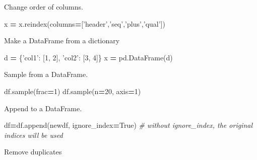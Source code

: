 \documentclass[]{book}
\newenvironment{Shaded}{\begin{snugshade}}{\end{snugshade}}
\newcommand{\CommentTok}[1]{\textcolor[rgb]{0.56,0.35,0.01}{\textit{#1}}}
\newcommand{\DecValTok}[1]{\textcolor[rgb]{0.00,0.00,0.81}{#1}}
\newcommand{\NormalTok}[1]{#1}
\newcommand{\OperatorTok}[1]{\textcolor[rgb]{0.81,0.36,0.00}{\textbf{#1}}}
\newcommand{\StringTok}[1]{\textcolor[rgb]{0.31,0.60,0.02}{#1}}
\newcommand{\VariableTok}[1]{\textcolor[rgb]{0.00,0.00,0.00}{#1}}
\begin{document}
Change order of columns.

\begin{Shaded}
\begin{Highlighting}[]
\NormalTok{x }\OperatorTok{=}\NormalTok{ x.reindex(columns}\OperatorTok{=}\NormalTok{[}\StringTok{'header'}\NormalTok{,}\StringTok{'seq'}\NormalTok{,}\StringTok{'plus'}\NormalTok{,}\StringTok{'qual'}\NormalTok{])}
\end{Highlighting}
\end{Shaded}

Make a DataFrame from a dictionary

\begin{Shaded}
\begin{Highlighting}[]
\NormalTok{d }\OperatorTok{=}\NormalTok{ \{}\StringTok{'col1'}\NormalTok{: [}\DecValTok{1}\NormalTok{, }\DecValTok{2}\NormalTok{], }\StringTok{'col2'}\NormalTok{: [}\DecValTok{3}\NormalTok{, }\DecValTok{4}\NormalTok{]\}}
\NormalTok{x }\OperatorTok{=}\NormalTok{ pd.DataFrame(d)}
\end{Highlighting}
\end{Shaded}

Sample from a DataFrame.

\begin{Shaded}
\begin{Highlighting}[]
\NormalTok{df.sample(frac}\OperatorTok{=}\DecValTok{1}\NormalTok{)}
\NormalTok{df.sample(n}\OperatorTok{=}\DecValTok{20}\NormalTok{, axis}\OperatorTok{=}\DecValTok{1}\NormalTok{)}
\end{Highlighting}
\end{Shaded}

Append to a DataFrame.

\begin{Shaded}
\begin{Highlighting}[]
\NormalTok{df}\OperatorTok{=}\NormalTok{df.append(newdf, ignore_index}\OperatorTok{=}\VariableTok{True}\NormalTok{) }\CommentTok{# without ignore_index, the original indices will be used}
\end{Highlighting}
\end{Shaded}

Remove duplicates
\end{document}
